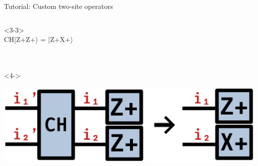 \begin{frame}[fragile]{Tutorial: Custom two-site operators}
\begin{columns}
\begin{column}{4.5cm}
\begin{onlyenv}<3-3>
~\\
CH|Z+Z+$\rangle$ = |Z+X+$\rangle$ \\
~\\
~\\
\end{onlyenv}

\begin{onlyenv}<4->
\vspace*{0.0cm}
\begin{center}
\includegraphics[width=1.0\textwidth]{
  slides/assets/CHZp1Zp2_to_Zp1Xp2.png
}
\end{center}
\vspace*{0.0cm}
\end{onlyenv}

\end{column}

\end{columns}

\end{frame}

